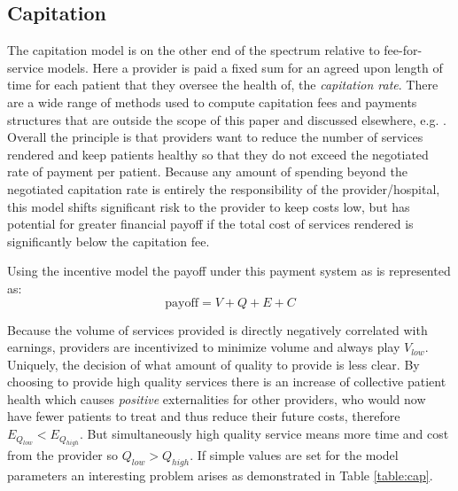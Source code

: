 \documentclass{article}
\begin{document}
\subsection{Capitation} \label{sec:capitation}
The capitation model is on the other end of the spectrum relative to fee-for-service models. Here a provider is paid a fixed sum for an agreed upon length of time for each patient that they oversee the health of, the \emph{capitation rate}. There are a wide range of methods used to compute capitation fees and payments structures that are outside the scope of this paper and discussed elsewhere, e.g. \cite{capfees}. Overall the principle is that providers want to reduce the number of services rendered and keep patients healthy so that they do not exceed the negotiated rate of payment per patient. Because any amount of spending beyond the negotiated capitation rate is entirely the responsibility of the provider/hospital, this model shifts significant risk to the provider to keep costs low, but has potential for greater financial payoff if the total cost of services rendered is significantly below the capitation fee.

Using the incentive model the payoff under this payment system as is represented as:
\begin{equation}
    \text{payoff} = V + Q + E + C
\end{equation}

Because the volume of services provided is directly negatively correlated with earnings, providers are incentivized to minimize volume and always play $V_{low}$. Uniquely, the decision of what amount of quality to provide is less clear. By choosing to provide high quality services there is an increase of collective patient health which causes \emph{positive} externalities for other providers, who would now have fewer patients to treat and thus reduce their future costs, therefore $E_{Q_{low}} < E_{Q_{high}}$. But simultaneously high quality service means more time and cost from the provider so $Q_{low} > Q_{high}$. If simple values are set for the model parameters an interesting problem arises as demonstrated in Table \ref{table:cap}.
\end{document}
